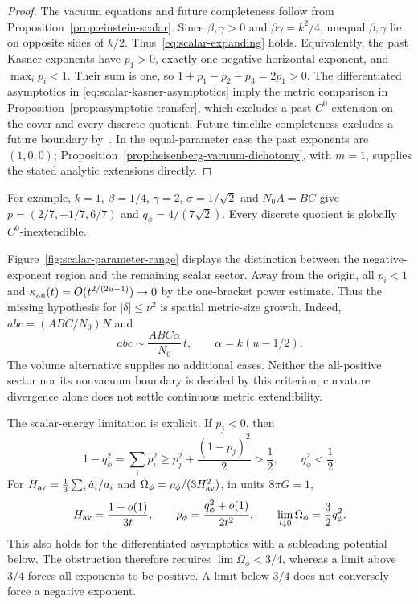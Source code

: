 \documentclass[10pt,a4paper]{article}
\numberwithin{equation}{section}
\theoremstyle{definition}
\theoremstyle{remark}
\begin{document}
\begin{proof}
The vacuum equations and future completeness follow from
Proposition~\ref{prop:einstein-scalar}.  Since $\beta,\gamma>0$ and
$\beta\gamma=k^2/4$, unequal $\beta,\gamma$ lie on opposite sides of
$k/2$.  Thus~\eqref{eq:scalar-expanding} holds.  Equivalently, the past
Kasner exponents have $p_1>0$, exactly one negative horizontal exponent,
and $\max_i p_i<1$.  Their sum is one, so
$1+p_1-p_2-p_3=2p_1>0$.  The differentiated asymptotics in
\eqref{eq:scalar-kasner-asymptotics} imply the metric comparison in
Proposition~\ref{prop:asymptotic-transfer}, which excludes a past
$C^0$ extension on the cover and every discrete quotient.  Future
timelike completeness excludes a future boundary by~\cite{GLS2018}.
In the equal-parameter case the past exponents are $(1,0,0)$;
Proposition~\ref{prop:heisenberg-vacuum-dichotomy}, with $m=1$, supplies
the stated analytic extensions directly.
\end{proof}

For example, $k=1$, $\beta=1/4$, $\gamma=2$,
$\sigma=1/\sqrt2$ and $N_0A=BC$ give
$p=(2/7,-1/7,6/7)$ and $q_\phi=4/(7\sqrt2)$.
Every discrete quotient is globally $C^0$-inextendible.

Figure~\ref{fig:scalar-parameter-range} displays the distinction
between the negative-exponent region and the remaining scalar
sector.  Away from the origin, all $p_i<1$ and
$\kappa_{\rm an}(t)=O(t^{2/(2u-1)})\to0$ by the one-bracket
power estimate.  Thus the missing hypothesis for
$|\delta|\le\nu^2$ is spatial metric-size growth.  Indeed,
$abc=(ABC/N_0)N$ and
\begin{equation}
 abc\sim\frac{ABC\alpha}{N_0}\,t,
 \qquad \alpha=k(u-1/2).
 \label{eq:scalar-volume-collapse}
\end{equation}
The volume alternative supplies no additional cases.  Neither
the all-positive sector nor its nonvacuum boundary is decided
by this criterion; curvature divergence alone does not settle
continuous metric extendibility.

The scalar-energy limitation is explicit.  If $p_j<0$, then
\begin{equation}
 1-q_\phi^2=\sum_i p_i^2
 \ge p_j^2+\frac{(1-p_j)^2}{2}>\frac12,
 \qquad q_\phi^2<\frac12.
 \label{eq:negative-exponent-scalar-bound}
\end{equation}
For $H_{\rm av}=\frac13\sum_i\dot a_i/a_i$ and
$\Omega_\phi=\rho_\phi/(3H_{\rm av}^2)$, in units $8\pi G=1$,
\begin{equation}
 H_{\rm av}=\frac{1+o(1)}{3t},\qquad
 \rho_\phi=\frac{q_\phi^2+o(1)}{2t^2},\qquad
 \lim_{t\downarrow0}\Omega_\phi=\frac32q_\phi^2.
 \label{eq:scalar-density-limit}
\end{equation}
This also holds for the differentiated asymptotics with a
subleading potential below.  The obstruction therefore requires
$\lim\Omega_\phi<3/4$, whereas a limit above $3/4$ forces all
exponents to be positive.  A limit below $3/4$ does not conversely
force a negative exponent.
\end{document}
